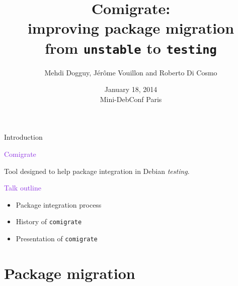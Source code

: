 \documentclass[xcolor={dvipsnames}]{beamer}
\title[Comigrate]%
{Comigrate: \\ improving package migration \\
 from \texttt{unstable} to \texttt{testing}}
\author[Di Cosmo/Dogguy/Vouillon]{Mehdi Dogguy, J\'er\^ome Vouillon and Roberto Di Cosmo}
\date[2014-01-18]{January 18, 2014\\ Mini-DebConf Paris}
\newcommand{\EEE}[1]{\textcolor{BlueViolet}{#1}}
\begin{document}
\begin{frame}[label=title]{}
 \titlepage
 \vspace{-1.5cm}

\end{frame}

\begin{frame}{Introduction}

\EEE{Comigrate}

Tool designed to help package integration in Debian \textit{testing}.

\vspace{3em}

\EEE{Talk outline}
\begin{itemize}
\item Package integration process
\item History of \texttt{comigrate}
\item Presentation of \texttt{comigrate}
\end{itemize}
\end{frame}

\part{Package migration}
\frame{\partpage}
\end{document}
